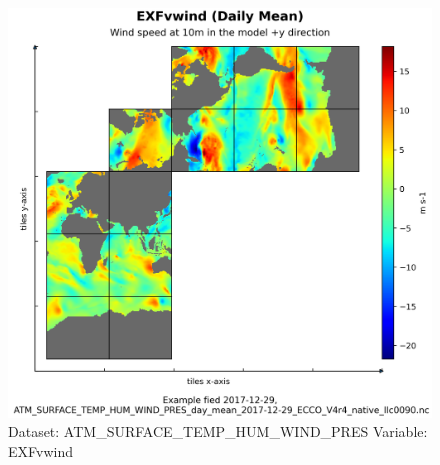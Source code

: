 \begin{figure}[H]
\centering
\includegraphics[width=\textwidth]{../images/plots/native_plots/Atmosphere_Surface_Temperature_Humidity_Wind_and_Pressure/EXFvwind.png}
\caption{Dataset: ATM\_SURFACE\_TEMP\_HUM\_WIND\_PRES Variable: EXFvwind}
\label{tab:table-ATM_SURFACE_TEMP_HUM_WIND_PRES_EXFvwind-Plot}
\end{figure}
\pagebreak
